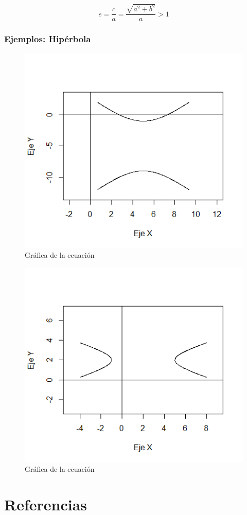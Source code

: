 \documentclass[12pt,a4paper]{article} %
\begin{document}
$$e = \frac{c}{a} = \frac{\sqrt{a^2 + b^2}}{a} > 1$$

\newpage

\subsubsection{Ejemplos: Hipérbola}


\begin{figure}[h]
\centering
\includegraphics[scale=0.8]{Hiperbola1}
\caption{Gráfica de la ecuación }
\label{fig:Hiperbola}
\end{figure}

\begin{figure}[ht]
\centering
\includegraphics[scale=0.8]{Hiperbola2}
\caption{Gráfica de la ecuación }
\label{fig:Hiperbola2}
\end{figure}


\newpage

\section{Referencias}



\end{document}
